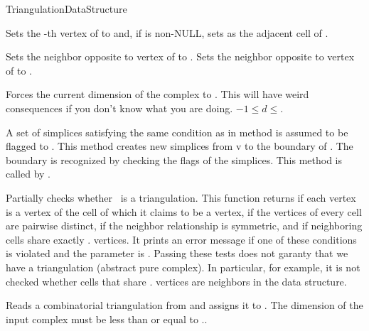 \begin{ccRefConcept}{TriangulationDataStructure}
\begin{ccAdvanced}
{Sets the -th vertex of  to  and, if  is non-NULL,
sets  as the adjacent cell of .}

{Sets the neighbor opposite to vertex  of   to
. Sets the neighbor opposite to vertex  of 
 to .}

 { Forces the current dimension
of the complex to . This will have weird consequences if you don't know
what you are doing. 
\ccPrecond $-1\leq d\leq$.}

{A set  of simplices satisfying the same condition as in method
\ccRefName{} is assumed to be flagged to . This
method creates new simplices from  v to the boundary of .
The boundary is recognized by checking the flags of the simplices.
This method is called by \ccRefName{}.}

\end{ccAdvanced}


{Partially checks whether \ccVar\ is a triangulation. This function
returns  if each vertex is a vertex of the cell of which it
claims to be a vertex, if the vertices of every cell are pairwise distinct,
if the neighbor relationship is symmetric, and if neighboring cells share
exactly \ccVar. vertices. It prints an error message
if one of these conditions is violated and the  parameter is
. Passing these tests does not garanty that we have a
triangulation (abstract pure
complex). In particular, for example, it is not
checked whether cells that share \ccVar. vertices
are neighbors in the data structure.}


{Reads a combinatorial triangulation from  and assigns it to
. \ccPrecond The dimension of the input complex must be less than or
equal to \ccVar..}


\end{ccRefConcept}
